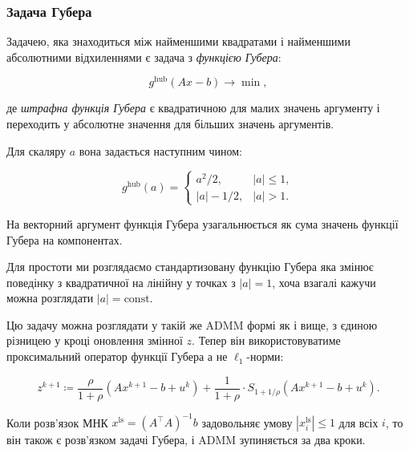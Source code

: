 \subsubsection{Задача Губера}

Задачею, яка знаходиться між найменшими квадратами і найменшими абсолютними відхиленнями є задача з \textit{функцією Губера}:

\begin{equation}
    g^{\text{hub}} (A x - b) \to \min,
\end{equation}

де \textit{штрафна функція Губера} є квадратичною для малих значень аргументу і переходить у абсолютне значення для більших значень аргументів. 

\begin{definition}
    Для скаляру $a$ вона задається наступним чином:

    \begin{equation}
        g^{\text{hub}}(a) = \begin{cases}
            a^2 / 2, & |a| \le 1, \\
            |a| - 1 / 2, & |a| > 1.
        \end{cases}
    \end{equation}
\end{definition}

\begin{remark}
    На векторний аргумент функція Губера узагальнюється як сума значень функції Губера на компонентах.
\end{remark}

\begin{remark}
    Для простоти ми розглядаємо стандартизовану функцію Губера яка змінює поведінку з квадратичної на лінійну у точках з $|a| = 1$, хоча взагалі кажучи можна розглядати $|a| = \text{const}$.
\end{remark}

Цю задачу можна розглядати у такій же ADMM формі як і вище, з єдиною різницею у кроці оновлення змінної $z$. Тепер він використовуватиме проксимальний оператор функції Губера а не $\ell_1$-норми:

\begin{equation}
    z^{k + 1} \coloneqq \frac{\rho}{1 + \rho} \left( A x^{k + 1} - b + u^k \right) + \frac{1}{1 + \rho} \cdot S_{1 + 1/\rho} \left( A x^{k + 1} - b + u^k \right).
\end{equation}

\begin{remark}
    Коли розв'язок МНК $x^{\text{ls}} = \left( A^\intercal A \right)^{-1} b$ задовольняє умову $\left| x_i^{\text{ls}} \right| \le 1$ для всіх $i$, то він також є розв'язком задачі Губера, і ADMM зупиняється за два кроки.
\end{remark}

